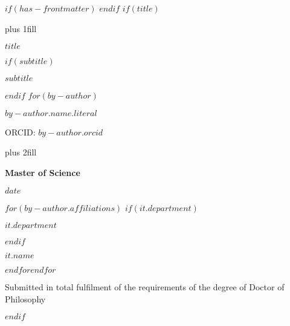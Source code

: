 $if(has-frontmatter)$
\frontmatter
$endif$
$if(title)$
\cleardoublepage
\thispagestyle{empty}
{\centering
\hbox{}\vskip 0cm plus 1fill
{\Huge\bfseries $title$ \par}
$if(subtitle)$
\vspace{3ex}
{\Large\bfseries $subtitle$ \par}
$endif$
\vspace{12ex}
$for(by-author)$
{\Large\bfseries $by-author.name.literal$ \par}
\vspace{3ex}
{\Large ORCID: $by-author.orcid$ \par}
\vskip 0cm plus 2fill
{\bfseries\large Master of Science \par}
\vspace{3ex}
{\bfseries\large $date$ \par}
\vspace{12ex}
$for(by-author.affiliations)$%
$if(it.department)$%
{\bfseries\large $it.department$ \par}
\vspace{3ex}
$endif$%
{\bfseries\large $it.name$ \par}
$endfor$$endfor$%
\vspace{12ex}
{\small Submitted in total fulfilment of the requirements
of the degree of Doctor of Philosophy \par}
}
$endif$
